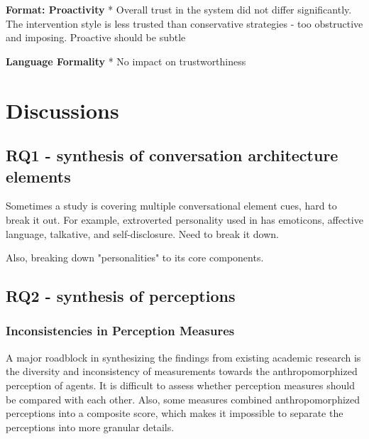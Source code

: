 \documentclass[sigconf,screen,review, anonymous]{acmart}
\newcommand{\cmt}[1]{}%
\begin{document}
\textbf{Format: Proactivity}
* Overall trust in the system did not differ significantly. The intervention style is less trusted than conservative strategies - too obstructive and imposing. Proactive should be subtle  \cite{kraus2020effects}\cmt{[64]}

\textbf{Language Formality}
* No impact on trustworthiness \cite{jestin2022effects}\cmt{[81]}


\section{Discussions}




\subsection{RQ1 - synthesis of conversation architecture elements}

Sometimes a study is covering multiple conversational element cues, hard to break it out. For example, extroverted personality used in \cite{volkel2022user}\cmt{[75]} has emoticons, affective language, talkative, and self-disclosure. Need to break it down.

Also, breaking down "personalities" to its core components.


\subsection{RQ2 - synthesis of perceptions}

\subsubsection{Inconsistencies in Perception Measures}

A major roadblock in synthesizing the findings from existing academic research is the diversity and inconsistency of measurements towards the anthropomorphized perception of agents. It is difficult to assess whether perception measures should be compared with each other. Also, some measures combined anthropomorphized perceptions into a composite score, which makes it impossible to separate the perceptions into more granular details.
\end{document}
